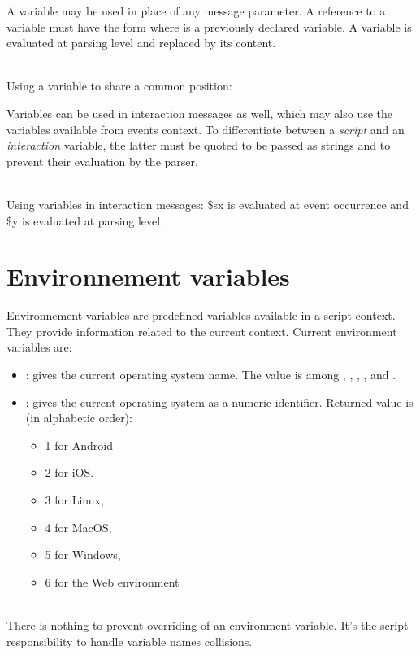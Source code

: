 \documentclass[a4paper,twoside]{report}
\newcommand{\sublevel}[1]	{\section{#1}}
\begin{document}
A variable may be used in place of any message parameter. A reference to a variable must have the form  where  is a previously declared variable. A variable is evaluated at parsing level and replaced by its content.

\example \\
Using a variable to share a common position:

Variables can be used in interaction messages as well, which may also use the variables available from events context. To differentiate between a \emph{script} and an \emph{interaction} variable, the latter must be quoted to be passed as strings and to prevent their evaluation by the parser. 

\example \\
Using variables in interaction messages: \$sx is evaluated at event occurrence	and \$y is evaluated at parsing level.

\sublevel{Environnement variables}
\label{envvar}

Environnement variables are predefined variables available in a script context. They provide information related to the current context. Current environment variables are:
\begin{itemize}
\item \textbf{}: gives the current operating system name. The value is among , , , ,  and .
\item \textbf{} : gives the current operating system as a numeric identifier. Returned value is (in alphabetic order): 
\begin{itemize}
\item 1 for Android
\item 2 for iOS.
\item 3 for Linux, 
\item 4 for MacOS, 
\item 5 for Windows, 
\item 6 for the Web environment 
\end{itemize}
\end{itemize}

\note\\
There is nothing to prevent overriding of an environment variable. It's the script responsibility to handle variable names collisions.
\end{document}
